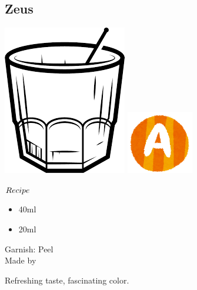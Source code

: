 \subsection{Zeus}
\vspace{-7.6mm}
\hspace{21mm}
\includegraphics[scale=.06]{cocktail_glass_rock.png}
\includegraphics[scale=.12]{capital_a.png}
\vspace{2.5mm}
\begin{itembox}[l]{\boldmath $Recipe$}
\begin{itemize}
\setlength{\parskip}{0cm}
\setlength{\itemsep}{0cm}
\item \campari 40ml
\item \vodka 20ml
\end{itemize}
\vspace{-4mm}
Garnish: \lemon Peel\\
Made by \build
\end{itembox}
Refreshing taste, fascinating color.
